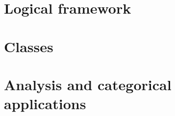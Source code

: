 
\tableofcontents
\newpage


\pagebreak

%
\chapter{Logical framework}

\pagebreak
\chapter{Classes}

\pagebreak

\pagebreak


\pagebreak

\pagebreak

\pagebreak

\pagebreak

\pagebreak


\pagebreak


\pagebreak

\pagebreak


\pagebreak

\pagebreak


\pagebreak

\pagebreak
\chapter{Analysis and categorical applications}

\pagebreak
%

\pagebreak

\pagebreak

\pagebreak

\pagebreak

\pagebreak

\pagebreak

\pagebreak

\pagebreak

\pagebreak

\pagebreak

\pagebreak

